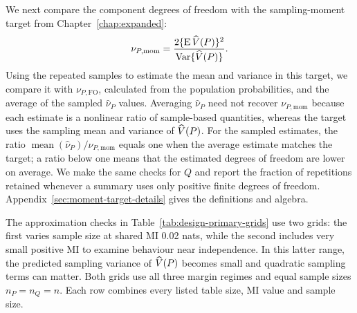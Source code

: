 We next compare the component degrees of freedom with the sampling-moment
target from Chapter~\ref{chap:expanded}:
\begin{equation}
 \nu_{P,\mathrm{mom}}
 =\frac{2\{\operatorname{E}\widehat V(P)\}^{2}}{\operatorname{Var}\{\widehat V(P)\}}.
 \label{eq:design-moment-target}
\end{equation}
Using the repeated samples to estimate the mean and variance in this
target, we compare it with \(\nu_{P,\mathrm{FO}}\), calculated from
the population probabilities, and the average of the sampled
\(\widehat\nu_P\) values. Averaging \(\widehat\nu_P\) need not recover
\(\nu_{P,\mathrm{mom}}\) because each estimate is a nonlinear ratio of
sample-based quantities, whereas the target uses the sampling mean and
variance of \(\widehat V(P)\). For the sampled estimates, the ratio
\(\operatorname{mean}(\widehat\nu_P)/\nu_{P,\mathrm{mom}}\) equals one
when the average estimate matches the target; a ratio below one means
that the estimated degrees of freedom are lower on average. We make the
same checks for \(Q\) and report the fraction of repetitions retained
whenever a summary uses only positive finite degrees of freedom.
Appendix~\ref{sec:moment-target-details} gives the definitions and algebra.

The approximation checks in Table~\ref{tab:design-primary-grids} use two grids:
the first varies
sample size at shared MI 0.02 nats, while the second includes very small
positive MI to examine behaviour near independence. In this latter range,
the predicted sampling variance of \(\widehat V(P)\) becomes small and
quadratic sampling terms can matter. Both grids use all
three margin regimes and equal sample sizes \(n_P=n_Q=n\). Each row
combines every listed table size, MI value and sample size.

